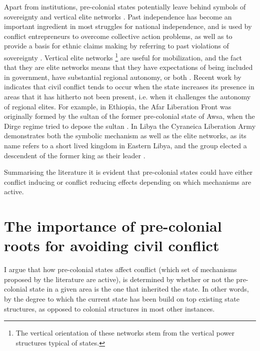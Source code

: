 \documentclass[12pt]{article}
\begin{document}
Apart from institutions, pre-colonial states potentially leave behind symbols of
sovereignty and vertical elite networks \citep{Wishman}. Past independence has
become an important ingredient in most struggles for national independence, and
is used by conflict entrepreneurs to overcome collective action problems, as
well as to provide a basis for ethnic claims making by referring to past
violations of sovereignty \citep{Ahram2019, Shelef2016}. Vertical elite networks
\footnote{The vertical orientation of these networks stem from the vertical
power structures typical of states.} are useful for mobilization, and the fact
that they are elite networks means that they have expectations of being included
in government, have substantial regional autonomy, or both \citep{Wishman}.
Recent work by \citet{Ying_2020} indicates that civil conflict tends to occur
when the state increases its presence in areas that it has hitherto not been
present, i.e. when it challenges the autonomy of regional elites. For example,
in Ethiopia, the Afar Liberation Front was originally formed by the sultan of
the former pre-colonial state of Awsa, when the Dirge regime tried to depose the
sultan \citep{Shehim1985, Hanfare2011}.  In Libya the Cyraneica Liberation Army
demonstrates both the symbolic mechanism as well as the elite networks, as its
name refers to a short lived kingdom in Eastern Libya, and the group elected a
descendent of the former king as their leader \citep{Ahram2019}.


Summarising the literature it is evident that pre-colonial states could have
either conflict inducing or conflict reducing effects depending on which
mechanisms are active.

\section{The importance of pre-colonial roots for avoiding civil conflict}

I argue that how pre-colonial states affect conflict (which set of mechanisms
proposed by the literature are active), is determined by whether or not the
pre-colonial state in a given area is the one that inherited the state.
In other words, by the degree to which the current state has been build on top
existing state structures, as opposed to colonial structures in most other
instances. 
\end{document}
